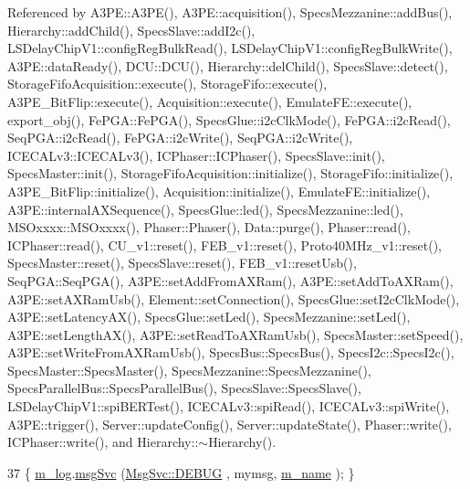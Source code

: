 Referenced by A3\+P\+E\+::\+A3\+P\+E(), A3\+P\+E\+::acquisition(), Specs\+Mezzanine\+::add\+Bus(), Hierarchy\+::add\+Child(), Specs\+Slave\+::add\+I2c(), L\+S\+Delay\+Chip\+V1\+::config\+Reg\+Bulk\+Read(), L\+S\+Delay\+Chip\+V1\+::config\+Reg\+Bulk\+Write(), A3\+P\+E\+::data\+Ready(), D\+C\+U\+::\+D\+C\+U(), Hierarchy\+::del\+Child(), Specs\+Slave\+::detect(), Storage\+Fifo\+Acquisition\+::execute(), Storage\+Fifo\+::execute(), A3\+P\+E\+\_\+\+Bit\+Flip\+::execute(), Acquisition\+::execute(), Emulate\+F\+E\+::execute(), export\+\_\+obj(), Fe\+P\+G\+A\+::\+Fe\+P\+G\+A(), Specs\+Glue\+::i2c\+Clk\+Mode(), Fe\+P\+G\+A\+::i2c\+Read(), Seq\+P\+G\+A\+::i2c\+Read(), Fe\+P\+G\+A\+::i2c\+Write(), Seq\+P\+G\+A\+::i2c\+Write(), I\+C\+E\+C\+A\+Lv3\+::\+I\+C\+E\+C\+A\+Lv3(), I\+C\+Phaser\+::\+I\+C\+Phaser(), Specs\+Slave\+::init(), Specs\+Master\+::init(), Storage\+Fifo\+Acquisition\+::initialize(), Storage\+Fifo\+::initialize(), A3\+P\+E\+\_\+\+Bit\+Flip\+::initialize(), Acquisition\+::initialize(), Emulate\+F\+E\+::initialize(), A3\+P\+E\+::internal\+A\+X\+Sequence(), Specs\+Glue\+::led(), Specs\+Mezzanine\+::led(), M\+S\+Oxxxx\+::\+M\+S\+Oxxxx(), Phaser\+::\+Phaser(), Data\+::purge(), Phaser\+::read(), I\+C\+Phaser\+::read(), C\+U\+\_\+v1\+::reset(), F\+E\+B\+\_\+v1\+::reset(), Proto40\+M\+Hz\+\_\+v1\+::reset(), Specs\+Master\+::reset(), Specs\+Slave\+::reset(), F\+E\+B\+\_\+v1\+::reset\+Usb(), Seq\+P\+G\+A\+::\+Seq\+P\+G\+A(), A3\+P\+E\+::set\+Add\+From\+A\+X\+Ram(), A3\+P\+E\+::set\+Add\+To\+A\+X\+Ram(), A3\+P\+E\+::set\+A\+X\+Ram\+Usb(), Element\+::set\+Connection(), Specs\+Glue\+::set\+I2c\+Clk\+Mode(), A3\+P\+E\+::set\+Latency\+A\+X(), Specs\+Glue\+::set\+Led(), Specs\+Mezzanine\+::set\+Led(), A3\+P\+E\+::set\+Length\+A\+X(), A3\+P\+E\+::set\+Read\+To\+A\+X\+Ram\+Usb(), Specs\+Master\+::set\+Speed(), A3\+P\+E\+::set\+Write\+From\+A\+X\+Ram\+Usb(), Specs\+Bus\+::\+Specs\+Bus(), Specs\+I2c\+::\+Specs\+I2c(), Specs\+Master\+::\+Specs\+Master(), Specs\+Mezzanine\+::\+Specs\+Mezzanine(), Specs\+Parallel\+Bus\+::\+Specs\+Parallel\+Bus(), Specs\+Slave\+::\+Specs\+Slave(), L\+S\+Delay\+Chip\+V1\+::spi\+B\+E\+R\+Test(), I\+C\+E\+C\+A\+Lv3\+::spi\+Read(), I\+C\+E\+C\+A\+Lv3\+::spi\+Write(), A3\+P\+E\+::trigger(), Server\+::update\+Config(), Server\+::update\+State(), Phaser\+::write(), I\+C\+Phaser\+::write(), and Hierarchy\+::$\sim$\+Hierarchy().


\begin{DoxyCode}
37 \{ \hyperlink{classObject_a0d269813dd7ac1f24bc143031e2963f2}{m\_log}.\hyperlink{classMsgSvc_ad25f18047920cc59a314e5098259711c}{msgSvc} (\hyperlink{classMsgSvc_ae671eb7301996cd049d2da8a65925926a1dbdcc82dce88370ec335883c83b38b0}{MsgSvc::DEBUG}   , mymsg, \hyperlink{classObject_a8b83c95c705d2c3ba0d081fe1710f48d}{m\_name} ); \}
\end{DoxyCode}
\mbox{\label{classObject_a6c9a0397ca804e04d675ed05683f5420}} 
